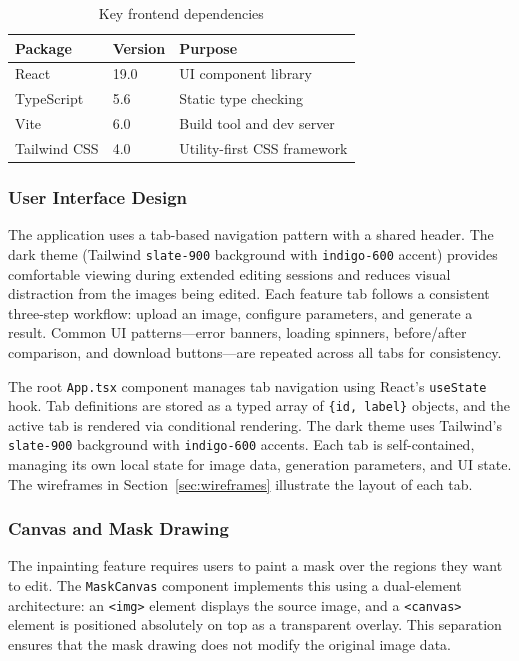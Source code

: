 \documentclass[12pt,a4paper]{report}
\begin{document}
\begin{table}[H]
\centering
\caption{Key frontend dependencies}
\label{tab:frontend_deps}
\begin{tabularx}{\textwidth}{l l X}
\toprule
\textbf{Package} & \textbf{Version} & \textbf{Purpose} \\
\midrule
React & 19.0 & UI component library \\
TypeScript & 5.6 & Static type checking \\
Vite & 6.0 & Build tool and dev server \\
Tailwind CSS & 4.0 & Utility-first CSS framework \\
\bottomrule
\end{tabularx}
\end{table}

\subsubsection{User Interface Design}
\label{sec:ui_design}

The application uses a tab-based navigation pattern with a shared header. The dark theme (Tailwind \texttt{slate-900} background with \texttt{indigo-600} accent) provides comfortable viewing during extended editing sessions and reduces visual distraction from the images being edited. Each feature tab follows a consistent three-step workflow: upload an image, configure parameters, and generate a result. Common UI patterns---error banners, loading spinners, before/after comparison, and download buttons---are repeated across all tabs for consistency.

The root \texttt{App.tsx} component manages tab navigation using React's \texttt{useState} hook. Tab definitions are stored as a typed array of \texttt{\{id, label\}} objects, and the active tab is rendered via conditional rendering. The dark theme uses Tailwind's \texttt{slate-900} background with \texttt{indigo-600} accents. Each tab is self-contained, managing its own local state for image data, generation parameters, and UI state. The wireframes in Section~\ref{sec:wireframes} illustrate the layout of each tab.

\subsubsection{Canvas and Mask Drawing}
\label{sec:canvas_mask}

The inpainting feature requires users to paint a mask over the regions they want to edit. The \texttt{MaskCanvas} component implements this using a dual-element architecture: an \texttt{<img>} element displays the source image, and a \texttt{<canvas>} element is positioned absolutely on top as a transparent overlay. This separation ensures that the mask drawing does not modify the original image data.
\end{document}
